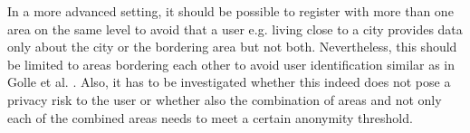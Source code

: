 In a more advanced setting, it should be possible to register with more than one area on the same level to avoid that a user e.g. living close to a city provides data only about the city or the bordering area but not both. Nevertheless, this should be limited to areas bordering each other to avoid user identification similar as in Golle et al. \parencite{privacy-home-work-pairs}. Also, it has to be investigated whether this indeed does not pose a privacy risk to the user or whether also the combination of areas and not only each of the combined areas needs to meet a certain anonymity threshold.